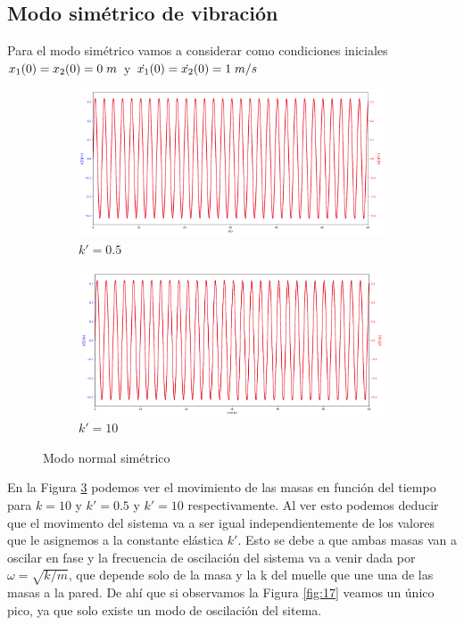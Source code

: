 \documentclass{article}
\begin{document}
\subsection{Modo simétrico de vibración}
Para el modo simétrico vamos a considerar como condiciones iniciales $x_1(0)=x_2(0)=0\hspace{0.1cm}m$ y $\dot{x_1}(0)=\dot{x_2}(0)=1\hspace{0.1cm}m/s$
\begin{figure}[H]
\centering
\begin{subfigure}[b]{0.45\linewidth}
\includegraphics[width=\linewidth]{simetrico_debil}
\caption{$k' = 0.5$}
\label{fig:3a}
\end{subfigure}
\begin{subfigure}[b]{0.45\linewidth}
\includegraphics[width=\linewidth]{simetrico_k_iguales}
\caption{$k' = 10$}
\label{fig:3b}
\end{subfigure}
\caption{Modo normal simétrico}
\label{fig:15}
\end{figure}
En la Figura \ref{fig:15} podemos ver el movimiento de las masas en función del tiempo para $k = 10$ y $k'=0.5$ y $k'=10$ respectivamente. Al ver esto podemos deducir que el movimento del sistema va a ser igual independientemente de los valores que le asignemos a la constante elástica $k'$. Esto se debe a que ambas masas van a oscilar en fase y la frecuencia de oscilación del sistema va a venir dada por $\omega = \sqrt{k/m}$, que depende solo de la masa y la k del muelle que une una de las masas a la pared. De ahí que si observamos la Figura \ref{fig:17} veamos un único pico, ya que solo existe un modo de oscilación del sitema.
\end{document}
